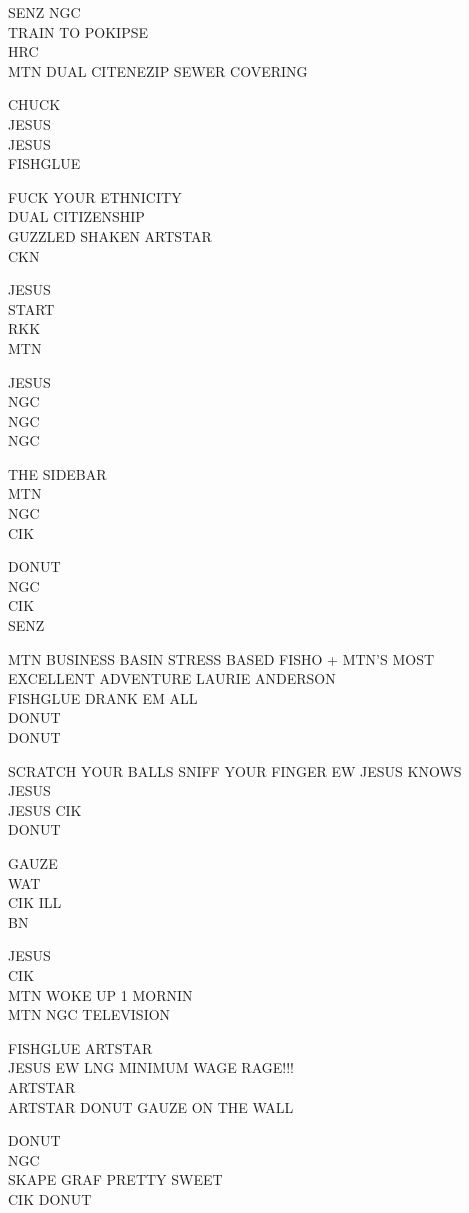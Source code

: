 \documentclass[10pt,letterpaper]{article}
\begin{document}
SENZ NGC\\
TRAIN TO POKIPSE\\
HRC\\
MTN DUAL CITENEZIP SEWER COVERING

CHUCK\\
JESUS\\
JESUS\\
FISHGLUE

FUCK YOUR ETHNICITY\\
DUAL CITIZENSHIP\\
GUZZLED SHAKEN ARTSTAR\\
CKN

JESUS\\
START\\
RKK\\
MTN

JESUS\\
NGC\\
NGC\\
NGC

THE SIDEBAR\\
MTN\\
NGC\\
CIK

DONUT\\
NGC\\
CIK\\
SENZ

MTN BUSINESS BASIN STRESS BASED FISHO + MTN'S MOST EXCELLENT ADVENTURE LAURIE ANDERSON\\
FISHGLUE DRANK EM ALL\\
DONUT\\
DONUT

SCRATCH YOUR BALLS SNIFF YOUR FINGER EW JESUS KNOWS\\
JESUS\\
JESUS CIK\\
DONUT

GAUZE\\
WAT\\
CIK ILL\\
BN

JESUS\\
CIK\\
MTN WOKE UP 1 MORNIN\\
MTN NGC TELEVISION

FISHGLUE ARTSTAR\\
JESUS EW LNG MINIMUM WAGE RAGE!!!\\
ARTSTAR\\
ARTSTAR DONUT GAUZE ON THE WALL

DONUT\\
NGC\\
SKAPE GRAF PRETTY SWEET\\
CIK DONUT
\end{document}
